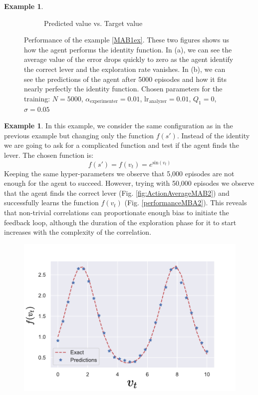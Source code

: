 \documentclass[11pt,a4paper,twoside]{report}
\newcommand{\+}{\textnormal{+} }
\theoremstyle{definition}
\newtheorem{myex}[mythm]{Example}
\numberwithin{equation}{chapter}
\begin{document}
\begin{myex}
\begin{figure}[]
\begin{subfigure}{.5\textwidth}
        \caption{Predicted value vs. Target value}
        \label{fig:predictionsMAB1}
      \end{subfigure}
      \caption{Performance of the example \ref{MAB1ex}. These two figures shows
      us how the agent performs the identity function. In (a), we can see
      the average value of the error drops quickly to zero as the agent identify
      the correct lever and the exploration rate vanishes. In (b), we can see the
      predictions of the agent after 5000 episodes and how it fits nearly
      perfectly the identity function. Chosen parameters for the training: $N=5000$,
      $\alpha_\text{experimenter}=0.01$, $\text{lr}_\text{analyzer}=0.01$,
      $Q_1=0$, $\sigma=0.05$}
    \end{figure} 
  \end{myex}
  \begin{myex} \label{MAB2ex}
    In this example, we consider the same configuration as in the previous
    example but changing only the function $f(s')$. Instead of 
    the identity we are going to ask for a complicated function and test if the
    agent finds the lever. The chosen function is:
    \begin{equation}
      f(s')=f(v_t)= e^{\text{sin}(v_t)}
    \end{equation}
    Keeping the same hyper-parameters we observe that 5,000 episodes are not
    enough for the agent to succeed. However, trying with 50,000 episodes we
    observe that the agent finds the correct lever (Fig.
    \ref{fig:ActionAverageMAB2}) and successfully learns the function $f(v_t)$
    (Fig. \ref{performanceMBA2}). This reveals that non-trivial correlations can
    proportionate enough bias to initiate the feedback loop, although the
    duration of the exploration phase for it to start increases 
    with the complexity of the correlation.


    \begin{figure}
      \centering
      \includegraphics[scale=0.5]{figures/performanceMBA2 edited.pdf}


\end{figure}
\end{myex}
\end{document}
